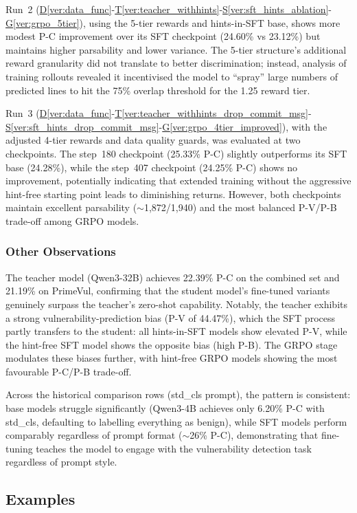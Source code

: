 \documentclass[12pt,a4paper]{article}
\newcommand{\vcode}[4]{\hyperref[#1]{D\ref*{#1}}-\hyperref[#2]{T\ref*{#2}}-\hyperref[#3]{S\ref*{#3}}-\hyperref[#4]{G\ref*{#4}}}
\begin{document}
Run~2 (\vcode{ver:data_func}{ver:teacher_withhints}{ver:sft_hints_ablation}{ver:grpo_5tier}), using the 5-tier rewards and hints-in-SFT base, shows more modest P-C improvement over its SFT checkpoint (24.60\% vs 23.12\%) but maintains higher parsability and lower variance. The 5-tier structure's additional reward granularity did not translate to better discrimination; instead, analysis of training rollouts revealed it incentivised the model to ``spray'' large numbers of predicted lines to hit the 75\% overlap threshold for the 1.25 reward tier.

Run~3 (\vcode{ver:data_func}{ver:teacher_withhints_drop_commit_msg}{ver:sft_hints_drop_commit_msg}{ver:grpo_4tier_improved}), with the adjusted 4-tier rewards and data quality guards, was evaluated at two checkpoints. The step~180 checkpoint (25.33\% P-C) slightly outperforms its SFT base (24.28\%), while the step~407 checkpoint (24.25\% P-C) shows no improvement, potentially indicating that extended training without the aggressive hint-free starting point leads to diminishing returns. However, both checkpoints maintain excellent parsability ($\sim$1,872/1,940) and the most balanced P-V/P-B trade-off among GRPO models.

\subsubsection{Other Observations}

The teacher model (Qwen3-32B) achieves 22.39\% P-C on the combined set and 21.19\% on PrimeVul, confirming that the student model's fine-tuned variants genuinely surpass the teacher's zero-shot capability. Notably, the teacher exhibits a strong vulnerability-prediction bias (P-V of 44.47\%), which the SFT process partly transfers to the student: all hints-in-SFT models show elevated P-V, while the hint-free SFT model shows the opposite bias (high P-B). The GRPO stage modulates these biases further, with hint-free GRPO models showing the most favourable P-C/P-B trade-off.

Across the historical comparison rows (std\_cls prompt), the pattern is consistent: base models struggle significantly (Qwen3-4B achieves only 6.20\% P-C with std\_cls, defaulting to labelling everything as benign), while SFT models perform comparably regardless of prompt format ($\sim$26\% P-C), demonstrating that fine-tuning teaches the model to engage with the vulnerability detection task regardless of prompt style.

\subsection{Examples}
\end{document}
